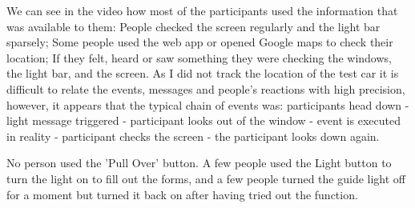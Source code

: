 We can see in the video how most of the participants used the information that was available to them: People checked the screen regularly and the light bar sparsely; Some people used the web app or opened Google maps to check their location; If they felt, heard or saw something they were checking the windows, the light bar, and the screen. As I did not track the location of the test car it is difficult to relate the events, messages and people's reactions with high precision, however, it appears that the typical chain of events was: participants head down - light message triggered - participant looks out of the window - event is executed in reality - participant checks the screen - the participant looks down again. 

No person used the 'Pull Over' button. A few people used the Light button to turn the light on to fill out the forms, and a few people turned the guide light off for a moment but turned it back on after having tried out the function. 

